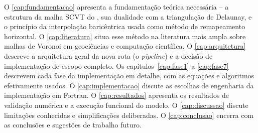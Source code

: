O \cref{cap:fundamentacao} apresenta a fundamentação teórica necessária
-- a estrutura da malha SCVT do \mpasa{}, sua dualidade com a
triangulação de Delaunay, e o princípio da interpolação baricêntrica
usada como método de remapeamento horizontal. O \cref{cap:literatura}
situa esse método na literatura mais ampla sobre malhas de Voronoi em
geociências e computação científica. O \cref{cap:arquitetura} descreve a
arquitetura geral da nova rota (o \emph{pipeline}) e a decisão de
implementação de escopo completo. Os capítulos~\ref{cap:fase1} a
\ref{cap:fase7} descrevem cada fase da implementação em detalhe, com as
equações e algoritmos efetivamente usados. O \cref{cap:implementacao}
discute as escolhas de engenharia da implementação em Fortran. O
\cref{cap:resultados} apresenta os resultados de validação numérica e a
execução funcional do modelo. O \cref{cap:discussao} discute limitações
conhecidas e simplificações deliberadas. O \cref{cap:conclusao} encerra
com as conclusões e sugestões de trabalho futuro.
